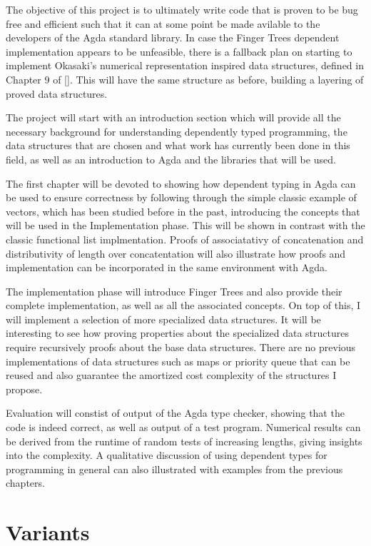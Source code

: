 \documentclass[12pt]{article}
\begin{document}
The objective of this project is to ultimately write code that is proven to be
bug free and efficient such that it can at some point be made avilable to the
developers of the Agda standard library.
In case the Finger Trees dependent implementation appears to be unfeasible,
there is a fallback plan on starting to implement Okasaki's numerical representation
inspired data structures, defined in Chapter 9 of []. This will have the same
structure as before, building a layering of proved data structures.

The project will start with an introduction section which will provide all the
necessary background for understanding dependently typed programming, the
data structures that are chosen and what work has currently been done in this
field, as well as an introduction to Agda and the libraries that will be used.

The first chapter will be devoted to showing how dependent typing in Agda can be
used to ensure correctness by following through the simple classic example of
vectors, which has been studied before in the past, introducing the concepts that
will be used in the Implementation phase. This will be shown in contrast with
the classic functional list implmentation. Proofs of associatativy of concatenation
and distributivity of length over concatentation will also illustrate how
proofs and implementation can be incorporated in the same environment with Agda.

The implementation phase will introduce Finger Trees and also provide their complete
implementation, as well as all the associated concepts. On top of this,
I will implement a selection of more specialized data structures. It will
be interesting to see how proving properties about the specialized data structures
require recursively proofs about the base data structures. There are no previous
implementations of data structures such as maps or priority queue that can be reused
and also guarantee the amortized cost complexity of the structures I propose.

Evaluation will constist of output of the Agda type checker, showing that the
code is indeed correct, as well as output of a test program. Numerical results
can be derived from the runtime of random tests of increasing lengths, giving
insights into the complexity.
A qualitative discussion of using dependent types for programming in general
can also illustrated with examples from the previous chapters.

\section*{Variants}
\end{document}
